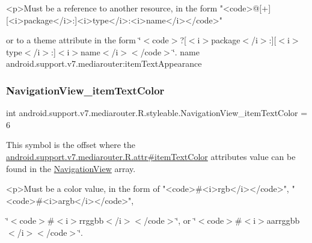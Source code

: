\begin{DoxyVerb}      <p>Must be a reference to another resource, in the form "<code>@[+][<i>package</i>:]<i>type</i>:<i>name</i></code>"
\end{DoxyVerb}
 or to a theme attribute in the form \char`\"{}$<$code$>$?\mbox{[}$<$i$>$package$<$/i$>$\+:\mbox{]}\mbox{[}$<$i$>$type$<$/i$>$\+:\mbox{]}$<$i$>$name$<$/i$>$$<$/code$>$\char`\"{}.  name android.\+support.\+v7.\+mediarouter\+:item\+Text\+Appearance \mbox{\label{classandroid_1_1support_1_1v7_1_1mediarouter_1_1R_1_1styleable_a3c571ca687d7349f2b900a1e08fdfe9d}} 
\subsubsection{\texorpdfstring{Navigation\+View\+\_\+item\+Text\+Color}{NavigationView\_itemTextColor}}
{\footnotesize\ttfamily int android.\+support.\+v7.\+mediarouter.\+R.\+styleable.\+Navigation\+View\+\_\+item\+Text\+Color = 6\hspace{0.3cm}{\ttfamily [static]}}

This symbol is the offset where the \hyperlink{classandroid_1_1support_1_1v7_1_1mediarouter_1_1R_1_1attr_afe2ce20b1e376096dd7cf27f1bda4df5}{android.\+support.\+v7.\+mediarouter.\+R.\+attr\#item\+Text\+Color} attribute\textquotesingle{}s value can be found in the \hyperlink{classandroid_1_1support_1_1v7_1_1mediarouter_1_1R_1_1styleable_a9216c77e145f14d4fdd264c2381fce44}{Navigation\+View} array.

\begin{DoxyVerb}      <p>Must be a color value, in the form of "<code>#<i>rgb</i></code>", "<code>#<i>argb</i></code>",
\end{DoxyVerb}
 \char`\"{}$<$code$>$\#$<$i$>$rrggbb$<$/i$>$$<$/code$>$\char`\"{}, or \char`\"{}$<$code$>$\#$<$i$>$aarrggbb$<$/i$>$$<$/code$>$\char`\"{}. 

